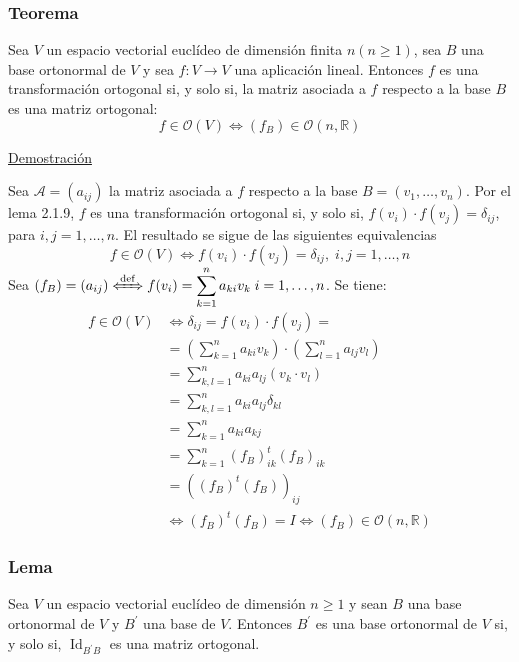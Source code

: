 \documentclass[12pt, a4paper, ones, notitlepage, openany,titlepage]{article}
\newcommand{\demostracion}{\noindent\underline{Demostración}}
\begin{document}
\subsubsection{Teorema}
Sea $V$ un espacio vectorial euclídeo de dimensión finita $n (n \ge 1)$, sea $B$ una base ortonormal de $V$ y sea $f: V \rightarrow V$ una aplicación lineal. Entonces $f$ es una transformación ortogonal si, y solo si, la matriz asociada a $f$ respecto a la base $B$ es una matriz ortogonal:
$$
f \in \mathcal{O}(V) \Longleftrightarrow \left(f_B\right) \in \mathcal{O}(n,\mathbb{R})
$$

\demostracion

Sea $\mathcal{A}=\left(a_{i j}\right)$ la matriz asociada a $f$ respecto a la base $B=\left(v_{1}, \ldots, v_{n}\right)$. Por el lema 2.1.9, $f$ es una transformación ortogonal si, y solo si, $f\left(v_{i}\right) \cdot f\left(v_{j}\right)=\delta_{i j}$, para $i, j=1, \ldots, n$. El resultado se sigue de las siguientes equivalencias
$$
f \in \mathcal{O}(V) \Longleftrightarrow f(v_i) \cdot f(v_j) = \delta_{ij}, \; i,j = 1,\ldots,n
$$
Sea $\displaystyle \left(f_B\right) = (a_{ij}) \xLeftrightarrow{\operatorname{def}} f(v_i) = \sum_{k=1}^{n} a_{ki} v_k \; i = 1,\ldots,n$. Se tiene:
$$
\begin{aligned}
	f \in \mathcal{O}(V) & \Longleftrightarrow \delta_{i j} = f\left(v_{i}\right) \cdot f\left(v_{j}\right) = \\
	& = \left(\sum_{k=1}^{n} a_{k i} v_{k}\right) \cdot\left(\sum_{l=1}^{n} a_{l j} v_{l}\right) \\
	& = \sum_{k, l=1}^{n} a_{k i} a_{l j} (v_k \cdot v_l) \\
	& = \sum_{k, l=1}^{n} a_{k i} a_{l j} \delta_{k l} \\
	& = \sum_{k=1}^{n} a_{k i} a_{k j} \\
	& = \sum_{k = 1}^{n} (f_B)^t_{ik} (f_B)_{ik} \\
	& = \left( (f_B)^t (f_B) \right)_{ij} \\
	& \Longleftrightarrow (f_B)^t (f_B) = I \Longleftrightarrow (f_B) \in \mathcal{O} (n, \mathbb{R})
\end{aligned}
$$

\subsubsection{Lema}
Sea $V$ un espacio vectorial euclídeo de dimensión $n \geq 1$ y sean $B$ una base ortonormal de $V$ y $B^{\prime}$ una base de $V$. Entonces $B^{\prime}$ es una base ortonormal de $V$ si, y solo si, $\operatorname{Id}_{B^{\prime} B}$ es una matriz ortogonal.\\
\end{document}
